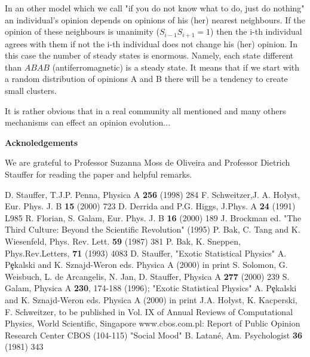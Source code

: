 In an other model which we call "if you do not know what to do, just
do nothing" an individual's opinion depends on opinions of his (her)
nearest neighbours. If the opinion of these neighbours is
unanimity ($S_{i-1}S_{i+1}=1$) then the i-th individual agrees
with them if not the i-th individual does not change his (her) opinion. In
this case the number of steady states is enormous. Namely, each
state different than $ABAB$ (antiferromagnetic) is a steady
state. It means that if we start with a random distribution of
opinions A and B there will be a tendency to create small clusters.

It is rather obvious that in a real community all mentioned
and many others mechanisms can effect an opinion evolution...

{\bf Acknoledgements}

We are grateful to Professor Suzanna Moss de Oliveira 
and Professor Dietrich Stauffer for reading the paper and helpful
remarks.

\begin{thebibliography}{22}
D. Stauffer, T.J.P. Penna, Physica A {\bf 256} (1998) 284
F. Schweitzer,J. A. Ho{\l}yst, Eur. Phys. J. B {\bf 15} (2000) 723
D. Derrida and P.G. Higgs, J.Phys. A {\bf 24} (1991) L985
R. Florian, S. Galam, Eur. Phys. J. B {\bf 16} (2000) 189
J. Brockman ed. "The Third Culture: Beyond the Scientific Revolution" (1995)
P. Bak, C. Tang and K. Wiesenfeld, Phys. Rev. Lett. {\bf 59} (1987) 381
P. Bak, K. Sneppen,  Phys.Rev.Letters, {\bf  71} (1993) 4083
D. Stauffer, "Exotic Statistical Physics" A. P\c{e}kalski and K. Sznajd-Weron
eds. Physica A (2000) in print
S. Solomon, G. Weisbuch, L. de Arcangelis, N. Jan, D. Stauffer, Physica A
{\bf 277} (2000) 239
S. Galam, Physica A {\bf 230}, 174-188 (1996);
"Exotic Statistical Physics" A. P\c{e}kalski and K. Sznajd-Weron
eds. Physica A (2000) in print
J.A. Ho{\l}yst, K. Kacperski, F. Schweitzer, to be published in Vol. IX of
Annual Reviews of Computational Physics, World Scientific, Singapore
www.cbos.com.pl: Report of Public Opinion Research Center CBOS (104-115)
"Social Mood"
B. Latan\'e, Am. Psychologist {\bf 36} (1981) 343
\end{thebibliography}


